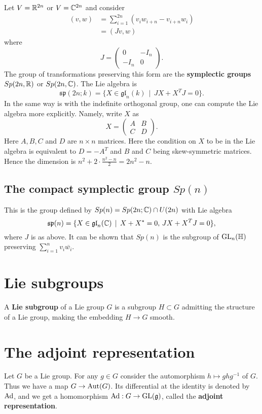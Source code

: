 \documentclass[11pt, english]{article}
\begin{document}
Let $V= \mathbb{R}^{2n}$ or $V= \mathbb{C}^{2n}$ and consider
\begin{align*}
  (v,w) &= \sum_{i=1}^{2n} (v_i w_{i+n}-v_{i+n}w_i) \\
&= (Jv,w)
\end{align*}
where
$$
J =
\begin{pmatrix}
  0 & -I_n \\
-I_n & 0 
\end{pmatrix}.
$$
The group of transformations preserving this form are the \textbf{symplectic groups} $Sp(2n,\mathbb{R})$ or $Sp(2n,\mathbb{C})$. The Lie algebra is
$$
\mathfrak{sp}(2n;k) = \{ X \in \mathfrak{gl}_n(k) \, \mid \, JX+X^TJ = 0 \}.
$$
In the same way is with the indefinite orthogonal group, one can compute the Lie algebra more explicitly. Namely, write $X$ as 
$$
X =
\begin{pmatrix}
  A & B \\
C & D
\end{pmatrix}.
$$
Here $A,B,C$ and $D$ are $n \times n$ matrices. Here the condition on $X$ to be in the Lie algebra is equivalent to $D=-A^T$ and $B$ and $C$ being skew-symmetric matrices. Hence the dimension is $n^2+2 \cdot \frac{n^2-n}{2} = 2n^2-n$.

\subsection{The compact symplectic group $Sp(n)$} 

This is the group defined by $Sp(n) = Sp(2n; \mathbb{C}) \cap U(2n)$ with Lie algebra
$$
\mathfrak{sp}(n) = \{ X \in \mathfrak{gl}_n(\mathbb{C}) \, \mid \, X+X^*=0, \, JX+X^TJ = 0\},
$$
where $J$ is as above. It can be shown that $Sp(n)$ is the subgroup of $\operatorname{GL}_n(\mathbb H)$ preserving $\sum_{i=1}^n v_i \overline{w_i}$. 

\newpage
\section{Lie subgroups}

A \textbf{Lie subgroup} of a Lie group $G$ is a subgroup $H \subset G$ admitting the structure of a Lie group, making the embedding $H \to G$ smooth. 

\section{The adjoint representation}

Let $G$ be a Lie group. For any $g \in G$ consider the automorphism $h \mapsto ghg^{-1}$ of $G$. Thus we have a map $G \to \operatorname{Aut}(G)$. Its differential at the identity is denoted by $\operatorname{Ad}$, and we get a homomorphism $\operatorname{Ad}:G \to \operatorname{GL}(\mathfrak g)$, called the \textbf{adjoint representation}.
\end{document}
